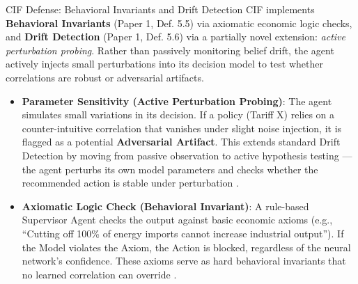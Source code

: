 \documentclass[
  ignorenonframetext,
]{beamer}
\providecommand{\tightlist}{%
  \setlength{\itemsep}{0pt}\setlength{\parskip}{0pt}}
\begin{document}
\begin{frame}[allowframebreaks]{CIF Defense: Behavioral Invariants and
Drift Detection}
\protect{}\label{cif-defense-behavioral-invariants-and-drift-detection}
CIF implements \textbf{Behavioral Invariants} (Paper 1, Def. 5.5)
\cite{friedman2026cogsec1} via axiomatic economic logic checks, and
\textbf{Drift Detection} (Paper 1, Def. 5.6) \cite{friedman2026cogsec1}
via a partially novel extension: \emph{active perturbation probing}.
Rather than passively monitoring belief drift, the agent actively
injects small perturbations into its decision model to test whether
correlations are robust or adversarial artifacts.

\begin{itemize}
\tightlist
\item
  \textbf{Parameter Sensitivity (Active Perturbation Probing)}: The
  agent simulates small variations in its decision. If a policy (Tariff
  X) relies on a counter-intuitive correlation that vanishes under
  slight noise injection, it is flagged as a potential
  \textbf{Adversarial Artifact}. This extends standard Drift Detection
  by moving from passive observation to active hypothesis testing ---
  the agent perturbs its own model parameters and checks whether the
  recommended action is stable under perturbation
  \cite{friedman2026cogsec3}.
\item
  \textbf{Axiomatic Logic Check (Behavioral Invariant)}: A rule-based
  Supervisor Agent checks the output against basic economic axioms
  (e.g., ``Cutting off 100\% of energy imports cannot increase
  industrial output''). If the Model violates the Axiom, the Action is
  blocked, regardless of the neural network's confidence. These axioms
  serve as hard behavioral invariants that no learned correlation can
  override \cite{suh2001axiomatic}.
\end{itemize}
\end{frame}
\end{document}
